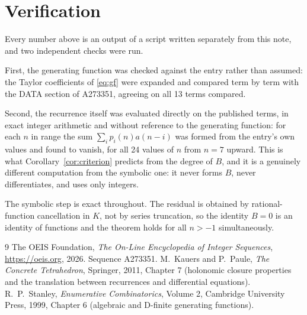 \documentclass[11pt,a4paper]{article}
\theoremstyle{plain}
\theoremstyle{definition}
\begin{document}
\section{Verification}

Every number above is an output of a script written separately from this note, and two
independent checks were run.

First, the generating function was checked against the entry rather than assumed: the
Taylor coefficients of \eqref{eq:gf} were expanded and compared term by term with the DATA
section of A273351, agreeing on all 13 terms compared.

Second, the recurrence itself was evaluated directly on the published terms, in exact
integer arithmetic and without reference to the generating function: for each $n$ in range
the sum $\sum_{i}p_{i}(n)a(n-i)$ was formed from the entry's own values and found to
vanish, for all 24 values of $n$ from $n=7$ upward. This is what
Corollary~\ref{cor:criterion} predicts from the degree of $B$, and it is a genuinely
different computation from the symbolic one: it never forms $B$, never differentiates, and
uses only integers.

The symbolic step is exact throughout. The residual is obtained by rational-function
cancellation in $K$, not by series truncation, so the identity $B=0$ is an
identity of functions and the theorem holds for all $n>-1$ simultaneously.

\begin{thebibliography}{9}
 The OEIS Foundation, \emph{The On-Line Encyclopedia of Integer Sequences},
\url{https://oeis.org}, 2026. Sequence A273351.
 M.~Kauers and P.~Paule, \emph{The Concrete Tetrahedron}, Springer, 2011,
Chapter 7 (holonomic closure properties and the translation between recurrences and
differential equations).
 R.~P.~Stanley, \emph{Enumerative Combinatorics}, Volume 2, Cambridge
University Press, 1999, Chapter 6 (algebraic and D-finite generating functions).
\end{thebibliography}
\end{document}
